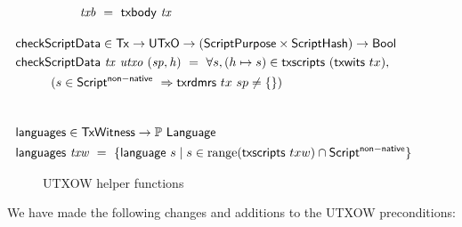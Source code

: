 \begin{figure}[htb]
\begin{align*}
    & ~~~~~~~ \var{txb}~=~\txbody{tx}
    \nextdef
    & \hspace{-1cm}\fun{checkScriptData} \in \Tx \to \UTxO \to (\ScriptPurpose \times \ScriptHash) \to \Bool \\
    & \hspace{-1cm}\fun{checkScriptData}~\var{tx}~\var{utxo}~(\var{sp},\var{h})~=~ \forall s, (h\mapsto s) \in \fun{txscripts}~(\fun{txwits}~tx),\\
    & (s \in \ScriptNonNative~\Rightarrow \fun{txrdmrs}~tx~sp \neq \{\}) \\
    \nextdef
    & \hspace{-1cm}\fun{languages} \in \TxWitness \to \powerset{\Language} \\
    & \hspace{-1cm}\fun{languages}~\var{txw}~=~
      \{\fun{language}~s \mid s \in \range (\fun{txscripts}~{txw}) \cap \ScriptNonNative\}
  \end{align*}
  \caption{UTXOW helper functions}
  \label{fig:functions-witnesses}
\end{figure}

We have made the following changes and additions to the UTXOW preconditions:

